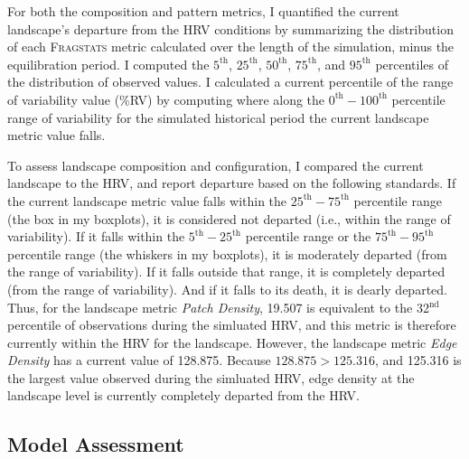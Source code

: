 For both the composition and pattern metrics, I quantified the current landscape's departure from the HRV conditions by summarizing the distribution of each \textsc{Fragstats} metric calculated over the length of the simulation, minus the equilibration period. I computed the $5^{\text{th}}$, $25^{\text{th}}$, $50^{\text{th}}$, $75^{\text{th}}$, and $95^{\text{th}}$ percentiles of the distribution of observed values. I calculated a current percentile of the range of variability value (\%RV) by computing where along the $0^{\text{th}}-100^{\text{th}}$ percentile range of variability for the simulated historical period the current landscape metric value falls. 

To assess landscape composition and configuration, I compared the current landscape to the HRV, and report departure based on the following standards. If the current landscape metric value falls within the $25^{\text{th}}-75^{\text{th}}$ percentile range (the box in my boxplots), it is considered not departed (i.e., within the range of variability). If it falls within the $5^{\text{th}}-25^{\text{th}}$ percentile range or the $75^{\text{th}}-95^{\text{th}}$ percentile range (the whiskers in my boxplots), it is moderately departed (from the range of variability). If it falls outside that range, it is completely departed (from the range of variability). And if it falls to its death, it is dearly departed. Thus, for the landscape metric \emph{Patch Density}, 19.507 is equivalent to the 32$^{\text{nd}}$ percentile of observations during the simluated HRV, and this metric is therefore currently within the HRV for the landscape. However, the landscape metric \emph{Edge Density} has a current value of 128.875. Because $128.875 > 125.316$, and 125.316 is the largest value observed during the simluated HRV, edge density at the landscape level is currently completely departed from the HRV. 

\clearpage

\subsection{Model Assessment}
\label{subsec:modelassessment}

